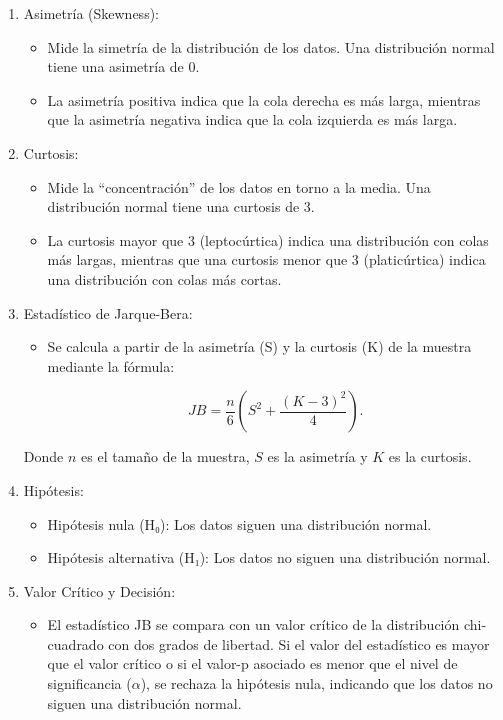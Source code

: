 \documentclass[
  us-letterpaper,
]{scrreprt}
\providecommand{\tightlist}{%
  \setlength{\itemsep}{0pt}\setlength{\parskip}{0pt}}\usepackage{longtable,booktabs,array}
\theoremstyle{plain}
\theoremstyle{plain}
\theoremstyle{definition}
\theoremstyle{remark}
\begin{document}
\begin{enumerate}
\def\labelenumi{\arabic{enumi}.}
\item
  Asimetría (Skewness):

  \begin{itemize}
  \item
    Mide la simetría de la distribución de los datos. Una distribución
    normal tiene una asimetría de 0.
  \item
    La asimetría positiva indica que la cola derecha es más larga,
    mientras que la asimetría negativa indica que la cola izquierda es
    más larga.
  \end{itemize}
\item
  Curtosis:

  \begin{itemize}
  \item
    Mide la ``concentración'' de los datos en torno a la media. Una
    distribución normal tiene una curtosis de 3.
  \item
    La curtosis mayor que 3 (leptocúrtica) indica una distribución con
    colas más largas, mientras que una curtosis menor que 3
    (platicúrtica) indica una distribución con colas más cortas.
  \end{itemize}
\item
  Estadístico de Jarque-Bera:

  \begin{itemize}
  \item
    Se calcula a partir de la asimetría (S) y la curtosis (K) de la
    muestra mediante la fórmula:

    \[JB = \frac{n}{6} \left( S^2 + \frac{(K - 3)^2}{4} \right).\]
  \end{itemize}

  Donde \(n\) es el tamaño de la muestra, \(S\) es la asimetría y \(K\)
  es la curtosis.
\item
  Hipótesis:

  \begin{itemize}
  \item
    Hipótesis nula (H₀): Los datos siguen una distribución normal.
  \item
    Hipótesis alternativa (H₁): Los datos no siguen una distribución
    normal.
  \end{itemize}
\item
  Valor Crítico y Decisión:

  \begin{itemize}
  \tightlist
  \item
    El estadístico JB se compara con un valor crítico de la distribución
    chi-cuadrado con dos grados de libertad. Si el valor del estadístico
    es mayor que el valor crítico o si el valor-p asociado es menor que
    el nivel de significancia (\(\alpha\)), se rechaza la hipótesis
    nula, indicando que los datos no siguen una distribución normal.
  \end{itemize}
\end{enumerate}
\end{document}
